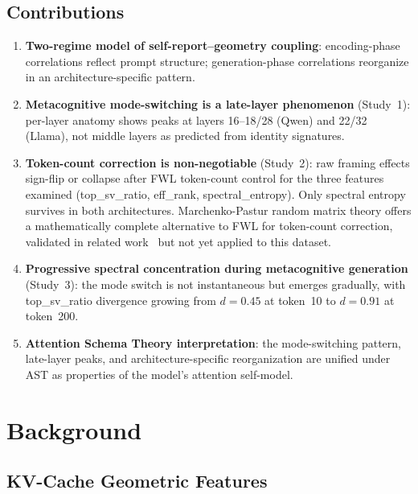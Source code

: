 \documentclass[11pt,a4paper]{article}
\begin{document}
\subsection{Contributions}

\begin{enumerate}
    \item \textbf{Two-regime model of self-report--geometry coupling}: encoding-phase correlations reflect prompt structure; generation-phase correlations reorganize in an architecture-specific pattern.

    \item \textbf{Metacognitive mode-switching is a late-layer phenomenon} (Study~1): per-layer anatomy shows peaks at layers 16--18/28 (Qwen) and 22/32 (Llama), not middle layers as predicted from identity signatures.

    \item \textbf{Token-count correction is non-negotiable} (Study~2): raw framing effects sign-flip or collapse after FWL token-count control for the three features examined (top\_sv\_ratio, eff\_rank, spectral\_entropy). Only spectral entropy survives in both architectures. Marchenko-Pastur random matrix theory offers a mathematically complete alternative to FWL for token-count correction, validated in related work~\citep{lyra2026oracle} but not yet applied to this dataset.

    \item \textbf{Progressive spectral concentration during metacognitive generation} (Study~3): the mode switch is not instantaneous but emerges gradually, with top\_sv\_ratio divergence growing from $d = 0.45$ at token~10 to $d = 0.91$ at token~200.

    \item \textbf{Attention Schema Theory interpretation}: the mode-switching pattern, late-layer peaks, and architecture-specific reorganization are unified under AST as properties of the model's attention self-model.
\end{enumerate}

\section{Background}
\label{sec:background}

\subsection{KV-Cache Geometric Features}
\end{document}
